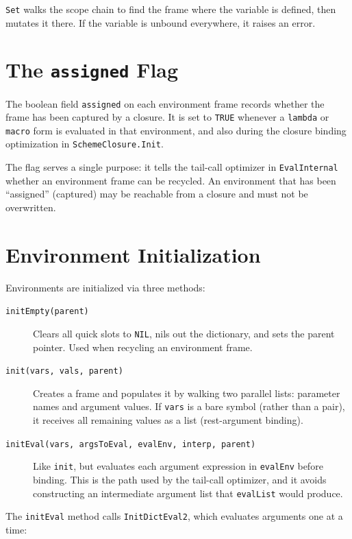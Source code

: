 \documentclass[12pt]{report}
\begin{document}
\texttt{Set} walks the scope chain to find the frame where the variable
is defined, then mutates it there.  If the variable is unbound everywhere,
it raises an error.

\section{The \texttt{assigned} Flag}
\label{sec:assigned}

The boolean field \texttt{assigned} on each environment frame records
whether the frame has been captured by a closure.  It is set to
\texttt{TRUE} whenever a \texttt{lambda} or \texttt{macro} form is
evaluated in that environment, and also during the closure binding
optimization in \texttt{SchemeClosure.Init}.

The flag serves a single purpose: it tells the tail-call optimizer in
\texttt{EvalInternal} whether an environment frame can be recycled.
An environment that has been ``assigned'' (captured) may be reachable
from a closure and must not be overwritten.

\section{Environment Initialization}
\label{sec:envinit}

Environments are initialized via three methods:

\begin{description}
\item[\texttt{initEmpty(parent)}] Clears all quick slots to \texttt{NIL},
  nils out the dictionary, and sets the parent pointer.  Used when
  recycling an environment frame.

\item[\texttt{init(vars, vals, parent)}] Creates a frame and populates
  it by walking two parallel lists: parameter names and argument values.
  If \texttt{vars} is a bare symbol (rather than a pair), it receives
  all remaining values as a list (rest-argument binding).

\item[\texttt{initEval(vars, argsToEval, evalEnv, interp, parent)}]
  Like \texttt{init}, but evaluates each argument expression in
  \texttt{evalEnv} before binding.  This is the path used by the
  tail-call optimizer, and it avoids constructing an intermediate
  argument list that \texttt{evalList} would produce.
\end{description}

The \texttt{initEval} method calls \texttt{InitDictEval2}, which
evaluates arguments one at a time:
\end{document}
